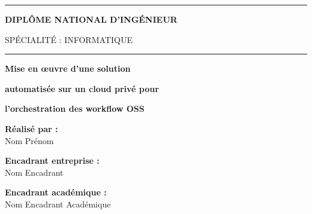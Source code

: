 \documentclass[12pt,a4paper,twoside]{report}
\begin{document}
\begin{titlepage}
    \rule{0.9\textwidth}{1.5pt}
    
    \vspace{0.5cm}
    
    {\Large\bfseries DIPLÔME NATIONAL D'INGÉNIEUR}
    
    \vspace{0.3cm}
    
    {\large SPÉCIALITÉ : INFORMATIQUE}
    
    \vspace{0.5cm}
    
    \rule{0.9\textwidth}{1.5pt}
    
    \vspace{1cm}
    
    {\LARGE\bfseries Mise en œuvre d'une solution}
    
    \vspace{0.2cm}
    
    {\LARGE\bfseries automatisée sur un cloud privé pour}
    
    \vspace{0.2cm}
    
    {\LARGE\bfseries l'orchestration des workflow OSS}
    
    \vspace{1.5cm}
    
    \begin{minipage}{0.45\textwidth}
        \begin{flushleft}
            \textbf{Réalisé par :}\\
            Nom Prénom
        \end{flushleft}
    \end{minipage}
    \hfill
    \begin{minipage}{0.45\textwidth}
        \begin{flushright}
            \textbf{Encadrant entreprise :}\\
            Nom Encadrant
        \end{flushright}
    \end{minipage}
    
    \vspace{0.8cm}
    
    \begin{minipage}{0.45\textwidth}
        \begin{flushleft}
            \textbf{Encadrant académique :}\\
            Nom Encadrant Académique
        \end{flushleft}
    \end{minipage}
    

\end{titlepage}
\end{document}

